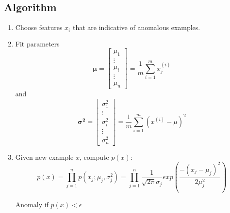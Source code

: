     \subsection{Algorithm}
        \begin{enumerate}
            \item Choose features $x_i$ that are indicative of anomalous examples. 
            \item Fit parameters 
                \begin{equation}
                \boldsymbol{\mu} = \begin{bmatrix}
                                            \mu_1       \\
                                            \vdots      \\
                                            \mu_i       \\
                                            \vdots      \\
                                            \mu_n       
                                        \end{bmatrix} = \frac{1}{m} \sum_{i=1}^{m} x_j^{(i)}
                    \label{eq:anomaly-mu}
                \end{equation} 
                                        and 
                \begin{equation}
                \boldsymbol{\sigma^2} = \begin{bmatrix}
                    \sigma^2_1       \\
                    \vdots      \\
                    \sigma^2_i       \\
                    \vdots      \\
                    \sigma^2_n       
                \end{bmatrix} = \frac{1}{m} \sum_{i=1}^{m} (x^{(i)} - \mu)^2
                    \label{eq:anomaly-sigma-squared}
                \end{equation}
        \item Given new example $x$, compute $p(x)$: 
                \begin{equation}
                    p(x) = \prod_{j=1}^{n} p(x_j;\mu_j, \sigma^2_j) = \prod_{j=1}^{n} \frac{1}{\sqrt{2 \pi} \sigma_j} exp(\frac{-(x_j - \mu_j)^2}{2 \mu_j ^2})
                    \label{eq:anomaly-p}
                \end{equation}

            Anomaly if $p(x) < \epsilon$

        \end{enumerate}
